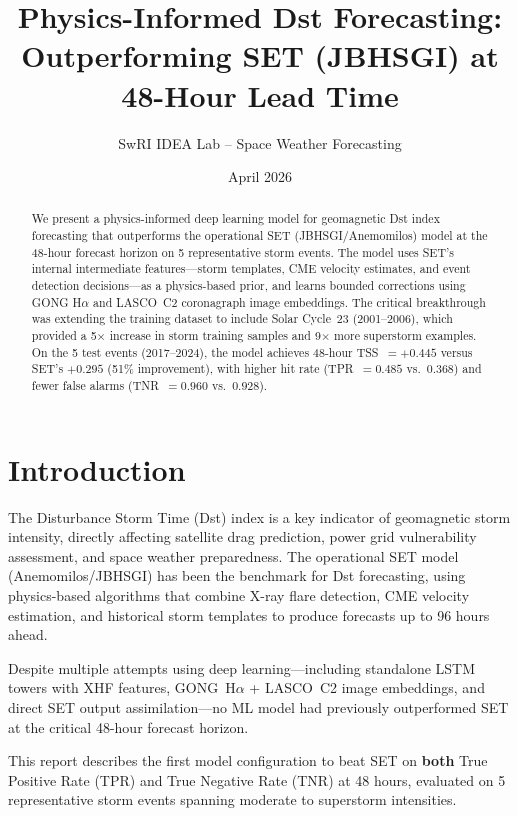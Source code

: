 \documentclass[11pt,a4paper]{article}
\title{Physics-Informed Dst Forecasting:\\Outperforming SET (JBHSGI) at 48-Hour Lead Time}
\author{SwRI IDEA Lab -- Space Weather Forecasting}
\date{April 2026}
\begin{document}
\maketitle

\begin{abstract}
We present a physics-informed deep learning model for geomagnetic Dst index forecasting that outperforms the operational SET (JBHSGI/Anemomilos) model at the 48-hour forecast horizon on 5 representative storm events. The model uses SET's internal intermediate features---storm templates, CME velocity estimates, and event detection decisions---as a physics-based prior, and learns bounded corrections using GONG H$\alpha$ and LASCO~C2 coronagraph image embeddings. The critical breakthrough was extending the training dataset to include Solar Cycle~23 (2001--2006), which provided a 5$\times$ increase in storm training samples and 9$\times$ more superstorm examples. On the 5 test events (2017--2024), the model achieves 48-hour TSS~$= +0.445$ versus SET's $+0.295$ (51\% improvement), with higher hit rate (TPR~$= 0.485$ vs.\ $0.368$) and fewer false alarms (TNR~$= 0.960$ vs.\ $0.928$).
\end{abstract}

\section{Introduction}

The Disturbance Storm Time (Dst) index is a key indicator of geomagnetic storm intensity, directly affecting satellite drag prediction, power grid vulnerability assessment, and space weather preparedness. The operational SET model (Anemomilos/JBHSGI) has been the benchmark for Dst forecasting, using physics-based algorithms that combine X-ray flare detection, CME velocity estimation, and historical storm templates to produce forecasts up to 96 hours ahead.

Despite multiple attempts using deep learning---including standalone LSTM towers with XHF features, GONG~H$\alpha$ + LASCO~C2 image embeddings, and direct SET output assimilation---no ML model had previously outperformed SET at the critical 48-hour forecast horizon.

This report describes the first model configuration to beat SET on \textbf{both} True Positive Rate (TPR) and True Negative Rate (TNR) at 48 hours, evaluated on 5 representative storm events spanning moderate to superstorm intensities.
\end{document}
